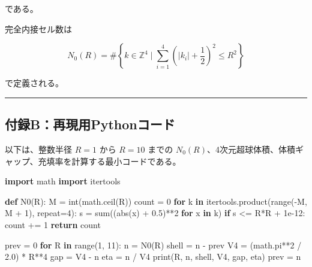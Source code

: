 \documentclass[
]{ltjsarticle}
\newenvironment{Shaded}{}{}
\newcommand{\BuiltInTok}[1]{\textcolor[rgb]{0.00,0.50,0.00}{#1}}
\newcommand{\ControlFlowTok}[1]{\textcolor[rgb]{0.00,0.44,0.13}{\textbf{#1}}}
\newcommand{\DecValTok}[1]{\textcolor[rgb]{0.25,0.63,0.44}{#1}}
\newcommand{\FloatTok}[1]{\textcolor[rgb]{0.25,0.63,0.44}{#1}}
\newcommand{\ImportTok}[1]{\textcolor[rgb]{0.00,0.50,0.00}{\textbf{#1}}}
\newcommand{\KeywordTok}[1]{\textcolor[rgb]{0.00,0.44,0.13}{\textbf{#1}}}
\newcommand{\NormalTok}[1]{#1}
\newcommand{\OperatorTok}[1]{\textcolor[rgb]{0.40,0.40,0.40}{#1}}
\begin{document}
である。

完全内接セル数は

\[
N_0(R)=\#\left\{k\in\mathbb{Z}^4\mid
\sum_{i=1}^{4}\left(|k_i|+\frac12\right)^2\le R^2
\right\}
\]

で定義される。

\begin{center}\rule{0.5\linewidth}{0.5pt}\end{center}

\subsection{付録B：再現用Pythonコード}\label{ux4ed8ux9332bux518dux73feux7528pythonux30b3ux30fcux30c9}

以下は、整数半径 \(R=1\) から \(R=10\) までの
\(N_0(R)\)、4次元超球体積、体積ギャップ、充填率を計算する最小コードである。

\begin{Shaded}
\begin{Highlighting}[]
\ImportTok{import}\NormalTok{ math}
\ImportTok{import}\NormalTok{ itertools}

\KeywordTok{def}\NormalTok{ N0(R):}
\NormalTok{    M }\OperatorTok{=} \BuiltInTok{int}\NormalTok{(math.ceil(R))}
\NormalTok{    count }\OperatorTok{=} \DecValTok{0}
    \ControlFlowTok{for}\NormalTok{ k }\KeywordTok{in}\NormalTok{ itertools.product(}\BuiltInTok{range}\NormalTok{(}\OperatorTok{{-}}\NormalTok{M, M }\OperatorTok{+} \DecValTok{1}\NormalTok{), repeat}\OperatorTok{=}\DecValTok{4}\NormalTok{):}
\NormalTok{        s }\OperatorTok{=} \BuiltInTok{sum}\NormalTok{((}\BuiltInTok{abs}\NormalTok{(x) }\OperatorTok{+} \FloatTok{0.5}\NormalTok{)}\OperatorTok{**}\DecValTok{2} \ControlFlowTok{for}\NormalTok{ x }\KeywordTok{in}\NormalTok{ k)}
        \ControlFlowTok{if}\NormalTok{ s }\OperatorTok{\textless{}=}\NormalTok{ R}\OperatorTok{*}\NormalTok{R }\OperatorTok{+} \FloatTok{1e{-}12}\NormalTok{:}
\NormalTok{            count }\OperatorTok{+=} \DecValTok{1}
    \ControlFlowTok{return}\NormalTok{ count}

\NormalTok{prev }\OperatorTok{=} \DecValTok{0}
\ControlFlowTok{for}\NormalTok{ R }\KeywordTok{in} \BuiltInTok{range}\NormalTok{(}\DecValTok{1}\NormalTok{, }\DecValTok{11}\NormalTok{):}
\NormalTok{    n }\OperatorTok{=}\NormalTok{ N0(R)}
\NormalTok{    shell }\OperatorTok{=}\NormalTok{ n }\OperatorTok{{-}}\NormalTok{ prev}
\NormalTok{    V4 }\OperatorTok{=}\NormalTok{ (math.pi}\OperatorTok{**}\DecValTok{2} \OperatorTok{/} \FloatTok{2.0}\NormalTok{) }\OperatorTok{*}\NormalTok{ R}\OperatorTok{**}\DecValTok{4}
\NormalTok{    gap }\OperatorTok{=}\NormalTok{ V4 }\OperatorTok{{-}}\NormalTok{ n}
\NormalTok{    eta }\OperatorTok{=}\NormalTok{ n }\OperatorTok{/}\NormalTok{ V4}
    \BuiltInTok{print}\NormalTok{(R, n, shell, V4, gap, eta)}
\NormalTok{    prev }\OperatorTok{=}\NormalTok{ n}
\end{Highlighting}
\end{Shaded}
\end{document}
